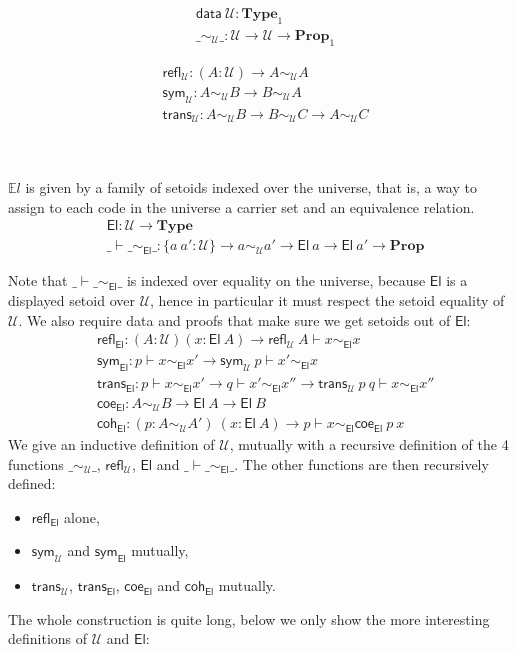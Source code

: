 \documentclass{easychair}
\newcommand{\setoidU}{\mathcal{U}}
\newcommand{\mType}{\mathbf{Type}}
\newcommand{\mProp}{\mathbf{Prop}}
\newcommand{\El}{\textsf{El}}
\newcommand{\EL}{\mathds{E}l}
\newcommand{\reflu}{\textsf{refl}_\setoidU}
\newcommand{\symu}{\textsf{sym}_\setoidU}
\newcommand{\transu}{\textsf{trans}_\setoidU}
\newcommand{\coeel}{\textsf{coe}_\El}
\newcommand{\cohel}{\textsf{coh}_\El}
\newcommand{\equ}[2]{#1 \sim_\setoidU #2}
\newcommand{\eqel}[3]{#1 \vdash #2 \sim_\El #3}
\begin{document}
\begin{minipage}{0.5\textwidth}
\begin{align*}
  & \textsf{data} \ \setoidU : \mType_1 \\
  & \_\sim_\setoidU\_ : \setoidU \to \setoidU \to \mProp_1
\end{align*}
\end{minipage}
\begin{minipage}{0.5\textwidth}
\begin{align*}
  & \textsf{refl}_\setoidU : (A : \setoidU) \to \equ{A}{A} \\
  & \textsf{sym}_\setoidU : \equ{A}{B} \to \equ{B}{A} \\
  & \textsf{trans}_\setoidU : \equ{A}{B} \to \equ{B}{C} \to \equ{A}{C}
\end{align*}
\end{minipage}
\\
~
\\

$\EL$ is given by a family of setoids indexed over the universe, that is, a way
to assign to each code in the universe a carrier set and an equivalence
relation.
%
\begin{align*}
  & \El : \setoidU \to \mType \\
  & \_\vdash\_\sim_\El\_ : \{a\ a' : \setoidU\} \to a \sim_\setoidU a' \to \El\ a \to \El\ a' \to \mProp
\end{align*}

Note that $\eqel{\_}{\_}{\_}$ is indexed over equality on the universe, because
$\El$ is a displayed setoid over $\setoidU$, hence in particular it must respect the setoid
equality of $\setoidU$.
%
We also require data and proofs that make sure we get setoids out of $\El$:
\begin{align*}
  & \textsf{refl}_\El : (A : \setoidU) (x : \El\ A) \to \eqel{\reflu\ A}{x}{x} \\
  & \textsf{sym}_\El : \eqel{p}{x}{x'} \to \eqel{\symu\ p}{x'}{x} \\
  & \textsf{trans}_\El : \eqel{p}{x}{x'} \to \eqel{q}{x'}{x''} \to \eqel{\transu\ p\ q}{x}{x''} \\
  & \coeel : \equ{A}{B} \to \El\ A \to \El\ B \\
  & \cohel : (p : \equ{A}{A'}) \ (x : \El\ A) \to \eqel{p}{x}{\coeel\ p\ x}
\end{align*}
%
We give an inductive definition of $\setoidU$, mutually with a recursive definition
of the 4 functions
$\_\sim_\setoidU\_$, $\textsf{refl}_\setoidU$, $\El$ and $\_\vdash\_\sim_\El\_$.
The other functions are then recursively defined:
\begin{itemize}
\item $\textsf{refl}_\El$ alone,
\item $\textsf{sym}_\setoidU$ and $\textsf{sym}_\El$ mutually,
\item $\textsf{trans}_\setoidU$, $\textsf{trans}_\El$, $\coeel$ and $\cohel$ mutually.
\end{itemize}
The whole construction is quite long, below we only show the more interesting
definitions of $\setoidU$ and $\El$:
\end{document}
